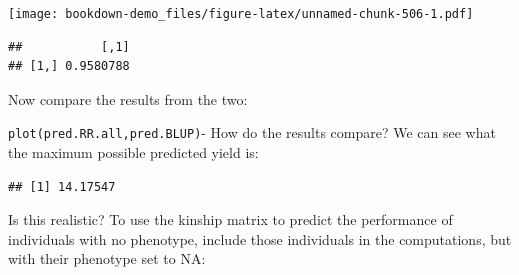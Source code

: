 \documentclass[
]{book}
\newenvironment{Shaded}{\begin{snugshade}}{\end{snugshade}}
\newcommand{\AttributeTok}[1]{\textcolor[rgb]{0.77,0.63,0.00}{#1}}
\newcommand{\ConstantTok}[1]{\textcolor[rgb]{0.00,0.00,0.00}{#1}}
\newcommand{\DecValTok}[1]{\textcolor[rgb]{0.00,0.00,0.81}{#1}}
\newcommand{\FunctionTok}[1]{\textcolor[rgb]{0.00,0.00,0.00}{#1}}
\newcommand{\NormalTok}[1]{#1}
\newcommand{\OtherTok}[1]{\textcolor[rgb]{0.56,0.35,0.01}{#1}}
\newcommand{\SpecialCharTok}[1]{\textcolor[rgb]{0.00,0.00,0.00}{#1}}
\begin{document}
\texttt{[image: bookdown-demo\_files/figure-latex/unnamed-chunk-506-1.pdf]}

\begin{Shaded}
\end{Shaded}

\begin{verbatim}
##           [,1]
## [1,] 0.9580788
\end{verbatim}

Now compare the results from the two:

\texttt{plot(pred.RR.all,pred.BLUP)}- How do the results compare? We can see what the maximum possible predicted yield is:

\begin{Shaded}
\end{Shaded}

\begin{verbatim}
## [1] 14.17547
\end{verbatim}

Is this realistic? To use the kinship matrix to predict the performance of individuals with no phenotype, include those individuals in the computations, but with their phenotype set to NA:

\begin{Shaded}
\end{Shaded}
\end{document}
